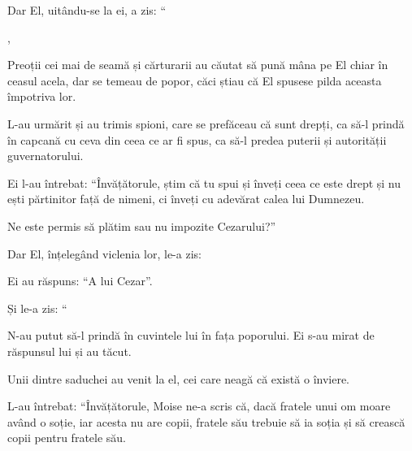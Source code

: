 {\par }{\PP {}Dar El, uitându-se la ei, a zis: “{}

\par }{

\par }{


\par }{\Q {},

\par }{


\par }{\PP {}Preoții cei mai de seamă și cărturarii au căutat să pună mâna pe El chiar în ceasul acela, dar se temeau de popor, căci știau că El spusese pilda aceasta împotriva lor.

L-au urmărit și au trimis spioni, care se prefăceau că sunt drepți, ca să-l prindă în capcană cu ceva din ceea ce ar fi spus, ca să-l predea puterii și autorității guvernatorului.

Ei l-au întrebat: “Învățătorule, știm că tu spui și înveți ceea ce este drept și nu ești părtinitor față de nimeni, ci înveți cu adevărat calea lui Dumnezeu.

Ne este permis să plătim sau nu impozite Cezarului?”


\par }{\PP {}Dar El, înțelegând viclenia lor, le-a zis:
{}


\par }{\PP Ei au răspuns: “A lui Cezar”.


\par }{\PP {}Și le-a zis: “{}


\par }{\PP {}N-au putut să-l prindă în cuvintele lui în fața poporului. Ei s-au mirat de răspunsul lui și au tăcut.

Unii dintre saduchei au venit la el, cei care neagă că există o înviere.

L-au întrebat: “Învățătorule, Moise ne-a scris că, dacă fratele unui om moare având o soție, iar acesta nu are copii, fratele său trebuie să ia soția și să crească copii pentru fratele său.

}
